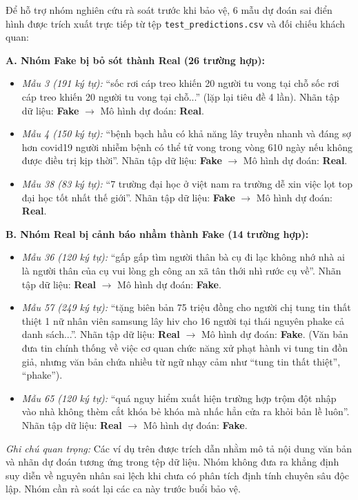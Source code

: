 \documentclass[12pt,a4paper]{report}
\begin{document}
Để hỗ trợ nhóm nghiên cứu rà soát trước khi bảo vệ, 6 mẫu dự đoán sai điển hình được trích xuất trực tiếp từ tệp \texttt{test\_predictions.csv} và đối chiếu khách quan:

\noindent\textbf{A. Nhóm Fake bị bỏ sót thành Real (26 trường hợp):}
\begin{itemize}[leftmargin=20pt]
  \item \textit{Mẫu 3 (191 ký tự):} ``sốc rơi cáp treo khiến 20 người tu vong tại chỗ sốc rơi cáp treo khiến 20 người tu vong tại chỗ...'' (lặp lại tiêu đề 4 lần). Nhãn tập dữ liệu: \textbf{Fake} $\rightarrow$ Mô hình dự đoán: \textbf{Real}.
  \item \textit{Mẫu 4 (150 ký tự):} ``bệnh bạch hầu có khả năng lây truyền nhanh và đáng sợ hơn covid19 người nhiễm bệnh có thể tử vong trong vòng 610 ngày nếu không được điều trị kịp thời''. Nhãn tập dữ liệu: \textbf{Fake} $\rightarrow$ Mô hình dự đoán: \textbf{Real}.
  \item \textit{Mẫu 38 (83 ký tự):} ``7 trường đại học ở việt nam ra trường dễ xin việc lọt top đại học tốt nhất thế giới''. Nhãn tập dữ liệu: \textbf{Fake} $\rightarrow$ Mô hình dự đoán: \textbf{Real}.
\end{itemize}

\noindent\textbf{B. Nhóm Real bị cảnh báo nhầm thành Fake (14 trường hợp):}
\begin{itemize}[leftmargin=20pt]
  \item \textit{Mẫu 36 (120 ký tự):} ``gấp gấp tìm người thân bà cụ đi lạc không nhớ nhà ai là người thân của cụ vui lòng gh công an xã tân thới nhì rước cụ về''. Nhãn tập dữ liệu: \textbf{Real} $\rightarrow$ Mô hình dự đoán: \textbf{Fake}.
  \item \textit{Mẫu 57 (249 ký tự):} ``tặng biên bản 75 triệu đồng cho người chị tung tin thất thiệt 1 nữ nhân viên samsung lây hiv cho 16 người tại thái nguyên phake cả danh sách...''. Nhãn tập dữ liệu: \textbf{Real} $\rightarrow$ Mô hình dự đoán: \textbf{Fake}. (Văn bản đưa tin chính thống về việc cơ quan chức năng xử phạt hành vi tung tin đồn giả, nhưng văn bản chứa nhiều từ ngữ nhạy cảm như ``tung tin thất thiệt'', ``phake'').
  \item \textit{Mẫu 65 (120 ký tự):} ``quá nguy hiểm xuất hiện trường hợp trộm đột nhập vào nhà không thèm cắt khóa bẻ khóa mà nhấc hẳn cửa ra khỏi bản lề luôn''. Nhãn tập dữ liệu: \textbf{Real} $\rightarrow$ Mô hình dự đoán: \textbf{Fake}.
\end{itemize}

\textit{Ghi chú quan trọng:} Các ví dụ trên được trích dẫn nhằm mô tả nội dung văn bản và nhãn dự đoán tương ứng trong tệp dữ liệu. Nhóm không đưa ra khẳng định suy diễn về nguyên nhân sai lệch khi chưa có phân tích định tính chuyên sâu độc lập. Nhóm cần rà soát lại các ca này trước buổi bảo vệ.
\end{document}
